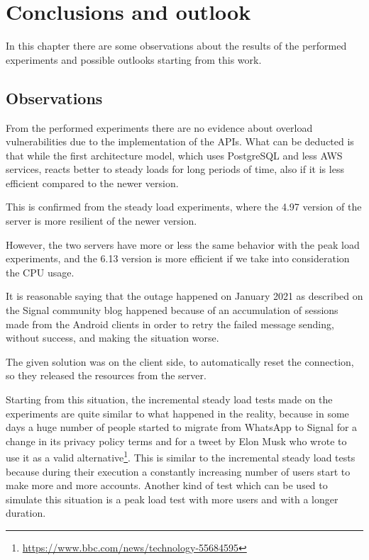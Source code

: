 \chapter{Conclusions and outlook\label{sec:conclusionsoutlook}}

In this chapter there are some observations about the results of the performed experiments and possible outlooks starting from this work.

\section{Observations\label{sec:observations}}

From the performed experiments there are no evidence about overload vulnerabilities due to the implementation of the APIs.
What can be deducted is that while the first architecture model, which uses PostgreSQL and less AWS services, reacts better to steady loads for long periods of time, also if it is less efficient compared to the newer version.

This is confirmed from the steady load experiments, where the 4.97 version of the server is more resilient of the newer version.

However, the two servers have more or less the same behavior with the peak load experiments, and the 6.13 version is more efficient if we take into consideration the CPU usage.

It is reasonable saying that the outage happened on January 2021 as described on the Signal community blog \parencite{outage} happened because of an accumulation of sessions made from the Android clients in order to retry the failed message sending, without success, and making the situation worse.

The given solution was on the client side, to automatically reset the connection, so they released the resources from the server.

Starting from this situation, the incremental steady load tests made on the experiments are quite similar to what happened in the reality, because in some days a huge number of people started to migrate from WhatsApp to Signal for a change in its privacy policy terms and for a tweet by Elon Musk who wrote to use it as a valid alternative\footnote{\url{https://www.bbc.com/news/technology-55684595}}.
This is similar to the incremental steady load tests because during their execution a constantly increasing number of users start to make more and more accounts.
Another kind of test which can be used to simulate this situation is a peak load test with more users and with a longer duration.

